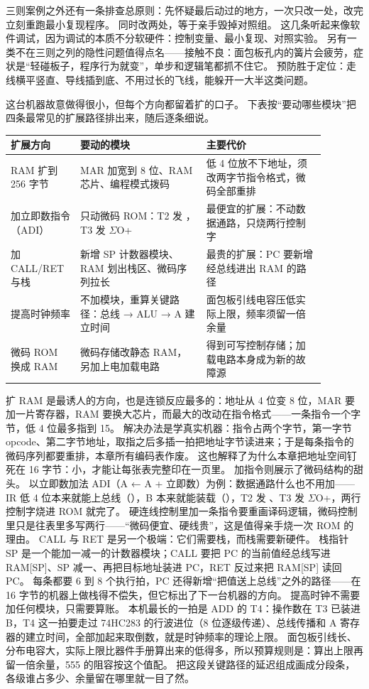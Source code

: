 三则案例之外还有一条排查总原则：先怀疑最后动过的地方，一次只改一处，改完立刻重跑最小复现程序。
同时改两处，等于亲手毁掉对照组。
这几条听起来像软件调试，因为调试的本质不分软硬件：控制变量、最小复现、对照实验。
另有一类不在三则之列的隐性问题值得点名——接触不良：面包板孔内的簧片会疲劳，症状是“轻碰板子，程序行为就变”，单步和逻辑笔都抓不住它。
预防胜于定位：走线横平竖直、导线插到底、不用过长的飞线，能躲开一大半这类问题。

这台机器故意做得很小，但每个方向都留着扩的口子。
下表按“要动哪些模块”把四条最常见的扩展路径排出来，随后逐条细说。

\begin{longtable}{L{0.18\linewidth}L{0.36\linewidth}L{0.34\linewidth}}
\toprule
扩展方向 & 要动的模块 & 主要代价 \\
\midrule
RAM 扩到 256 字节 & MAR 加宽到 8 位、RAM 芯片、编程模式拨码 & 低 4 位放不下地址，须改两字节指令格式，微码全部重排 \\
加立即数指令（ADI） & 只动微码 ROM：T2 发 ，T3 发 $\Sigma$O+ & 最便宜的扩展：不动数据通路，只烧两行控制字 \\
加 CALL/RET 与栈 & 新增 SP 计数器模块、RAM 划出栈区、微码序列拉长 & 最贵的扩展：PC 要新增经总线进出 RAM 的路径 \\
提高时钟频率 & 不加模块，重算关键路径：总线 → ALU → A 建立时间 & 面包板引线电容压低实际上限，频率须留一倍余量 \\
微码 ROM 换成 RAM & 微码存储改静态 RAM，另加上电加载电路 & 得到可写控制存储；加载电路本身成为新的故障源 \\
\bottomrule
\end{longtable}

扩 RAM 是最诱人的方向，也是连锁反应最多的：地址从 4 位变 8 位，MAR 要加一片寄存器，RAM 要换大芯片，而最大的改动在指令格式——一条指令一个字节，低 4 位最多指到 15。
解决办法是学真实机器：指令占两个字节，第一字节 opcode、第二字节地址，取指之后多插一拍把地址字节读进来；于是每条指令的微码序列都要重排，本章所有编码表作废。
这也解释了为什么本章把地址空间钉死在 16 字节：小，才能让每张表完整印在一页里。
加指令则展示了微码结构的甜头。
以立即数加法 ADI（A ← A + 立即数）为例：数据通路什么也不用加——IR 低 4 位本来就能上总线（），B 本来就能装载（），T2 发 、T3 发 $\Sigma$O+，两行控制字烧进 ROM 就完了。
硬连线控制里加一条指令要重画译码逻辑，微码控制里只是往表里多写两行——“微码便宜、硬线贵”，这是值得亲手烧一次 ROM 的理由。
CALL 与 RET 是另一个极端：它们需要栈，而栈需要新硬件。
栈指针 SP 是一个能加一减一的计数器模块；CALL 要把 PC 的当前值经总线写进 RAM[SP]、SP 减一、再把目标地址装进 PC，RET 反过来把 RAM[SP] 读回 PC。
每条都要 6 到 8 个执行拍，PC 还得新增“把值送上总线”之外的路径——在 16 字节的机器上做栈得不偿失，但它标出了下一台机器的方向。
提高时钟不需要加任何模块，只需要算账。
本机最长的一拍是 ADD 的 T4：操作数在 T3 已装进 B，T4 这一拍要走过 74HC283 的行波进位（8 位逐级传递）、总线传播和 A 寄存器的建立时间，全部加起来取倒数，就是时钟频率的理论上限。
面包板引线长、分布电容大，实际上限比器件手册算出来的低得多，所以预算规则是：算出上限再留一倍余量，555 的阻容按这个值配。
把这段关键路径的延迟组成画成分段条，各级谁占多少、余量留在哪里就一目了然。

